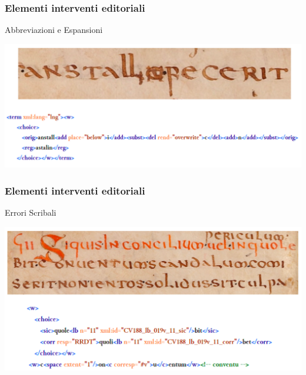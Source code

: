 \begin{frame}
    \frametitle{Elementi interventi editoriali}
    \addtocounter{nframe}{1}
    
   
    \begin{block}{Abbreviazioni e Espansioni}
        \begin{center}
            \includegraphics[width=.95\textwidth]{imgs/Aggiunta-cancellatura-regolarizzazione.png}
        \end{center}

    \end{block}
    
\end{frame}

\begin{frame}
    \frametitle{Elementi interventi editoriali}
    \addtocounter{nframe}{1}
    
   
    \begin{block}{Errori Scribali}
        \begin{center}
            \includegraphics[width=.95\textwidth]{imgs/Correzioni.png}
        \end{center}

    \end{block}
    
\end{frame}

